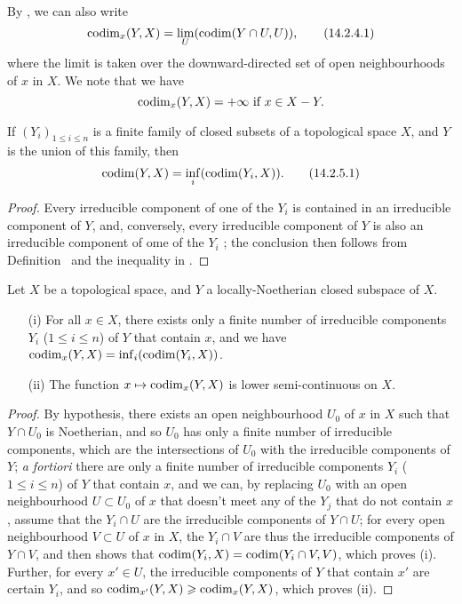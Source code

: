By , we can also write
\[
\label{0.14.2.4.1}
  \operatorname{codim}_x(Y,X)=\lim_U(\operatorname{codim}(Y\cap U,U)),
  \tag{14.2.4.1}
\]
where the limit is taken over the downward-directed set of open neighbourhoods of $x$ in $X$.
We note that we have
\[
  \operatorname{codim}_x(Y,X)=+\infty\text{ if }x\in X- Y.
\]

\begin{proposition}[14.2.5]
\label{0.14.2.5}
If $(Y_i)_{1\leq i\leq n}$ is a finite family of closed subsets of a topological space $X$, and $Y$ is the union of this family, then
\[
\label{0.14.2.5.1}
  \operatorname{codim}(Y,X)=\inf_i(\operatorname{codim}(Y_i,X)).
  \tag{14.2.5.1}
\]
\end{proposition}

\begin{proof}
Every irreducible component of one of the $Y_i$ is contained in an irreducible component of $Y$, and, conversely, every irreducible component of $Y$ is also an irreducible component of ome of the $Y_i$ ;
the conclusion then follows from Definition~ and the inequality in .
\end{proof}

\begin{corollary}
\label{0.14.2.6}
Let $X$ be a topological space, and $Y$ a locally-Noetherian closed subspace of $X$.
\begin{enumerate}
  \item[{\rm(i)}] For all $x\in X$, there exists only a finite number of irreducible components $Y_i$ ($1\leq i\leq n$) of $Y$ that contain $x$, and we have $\operatorname{codim}_x(Y,X)=\inf_i(\operatorname{codim}(Y_i,X))$.
  \item[{\rm(ii)}] The function $x\mapsto\codim_x(Y,X)$ is lower semi-continuous on $X$.
\end{enumerate}
\end{corollary}

\begin{proof}
By hypothesis, there exists an open neighbourhood $U_0$ of $x$ in $X$ such that $Y\cap U_0$ is Noetherian, and so $U_0$ has only a finite number of irreducible components, which are the intersections of $U_0$ with the irreducible components of $Y$;
\emph{a fortiori} there are only a finite number of irreducible components $Y_i$ ($1\leq i\leq n$) of $Y$ that contain $x$, and we can, by replacing $U_0$ with an open neighbourhood $U\subset U_0$ of $x$ that doesn't meet any of the $Y_j$ that do not contain $x$, assume that the $Y_i\cap U$ are the irreducible components of $Y\cap U$;
for every open neighbourhood $V\subset U$ of $x$ in $X$, the $Y_i\cap V$ are thus the irreducible components of $Y\cap V$, and  then shows that $\operatorname{codim}(Y_i,X)=\operatorname{codim}(Y_i\cap V,V)$, which proves (i).
Further, for every $x'\in U$, the irreducible components of $Y$ that contain $x'$ are certain $Y_i$, and so $\operatorname{codim}_{x'}(Y,X)\geqslant\operatorname{codim}_x(Y,X)$, which proves (ii).
\end{proof}

